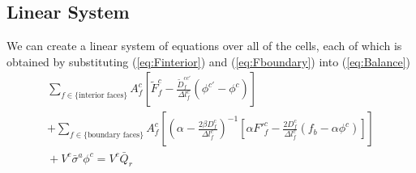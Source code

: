 \documentclass[12pt]{article}
\newcommand{\bfunc}{\ensuremath{f_{b}}}
\begin{document}
\subsection{Linear System}

We can create a linear system of equations over all of the cells, each of 
which is obtained by substituting (\ref{eq:Finterior}) and (\ref{eq:Fboundary})
into (\ref{eq:Balance})
\begin{multline}
        \sum_{f \in \{\text{interior faces}\}}
        A^{c}_{f} \left[
           \tilde{F}^{c}_{f} -  \frac{\tilde{D}^{cc'}_{f}}{\Delta l^{c}_{f}}
                                \left( \phi^{c'} - \phi^{c} \right)
        \right]
   \\
   +
        \sum_{f \in \{\text{boundary faces}\}}
        A^{c}_{f} \left[
                    \left( \alpha - \frac{2 \beta D^{c}_{f}}{\Delta l^{c}_{f}}
                    \right)^{-1}
                    \left[ \alpha {F'}^{c}_{f} - \frac{2 D^{c}_{f}}{\Delta l^{c}_{f}}
                                                \left(\bfunc - \alpha \phi^{c}\right)
                    \right]
        \right]
   \\
   \mbox{} +
         V^{c} \bar{\sigma}^{a} \phi^{c}
                = V^{c} \bar{Q}_{r}
\end{multline}
\end{document}
